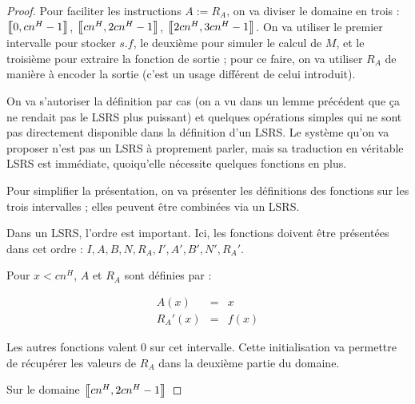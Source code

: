 \documentclass{article}
\newcommand{\eqpred}[3]{#1\left[ #2^{\leftarrow}(#3) \right]_{#3}}
\begin{document}
\begin{proof}
				\footnotetext{C'est l'opération $g, g' \mapsto \eqpred{g'}{g}{x}$}
			
			Pour faciliter les instructions $A:=R_A$, on va diviser le domaine en trois : $\left[\!\!\>\!\left[ 0 , cn^H-1 \right]\!\!\>\!\right]$, $\left[\!\!\>\!\left[ cn^H , 2cn^H-1 \right]\!\!\>\!\right]$, $\left[\!\!\>\!\left[ 2cn^H , 3cn^H-1 \right]\!\!\>\!\right]$.
			On va utiliser le premier intervalle pour stocker $s.f$, le deuxième pour simuler le calcul de $M$, et le troisième pour extraire la fonction de sortie ; pour ce faire, on va utiliser $R_A$ de manière à encoder la sortie (c'est un usage différent de celui introduit).
			
			On va s'autoriser la définition par cas (on a vu dans un lemme précédent que ça ne rendait pas le LSRS plus puissant) et quelques opérations simples qui ne sont pas directement disponible dans la définition d'un LSRS. Le système qu'on va proposer n'est pas un LSRS à proprement parler, mais sa traduction en véritable LSRS est immédiate, quoiqu'elle nécessite quelques fonctions en plus.
			
			Pour simplifier la présentation, on va présenter les définitions des fonctions sur les trois intervalles ; elles peuvent être combinées via un LSRS. 
			
			Dans un LSRS, l'ordre est important. Ici, les fonctions doivent être présentées dans cet ordre : $I, A, B, N, R_A, I', A', B', N', R_A'$.
			
			Pour $x < cn^H$, $A$ et $R_A$ sont définies par :
			
			\setcounter{equation}{0}
			\begin{eqnarray}
				A(x) & = & x \\
				R_A'(x) & = & f(x)
			\end{eqnarray}
			
			Les autres fonctions valent $0$ sur cet intervalle. Cette initialisation va permettre de récupérer les valeurs de $R_A$ dans la deuxième partie du domaine. 
			
			Sur le domaine $\left[\!\!\>\!\left[ cn^H , 2cn^H-1 \right]\!\!\>\!\right]$
			
\end{proof}
\end{document}
